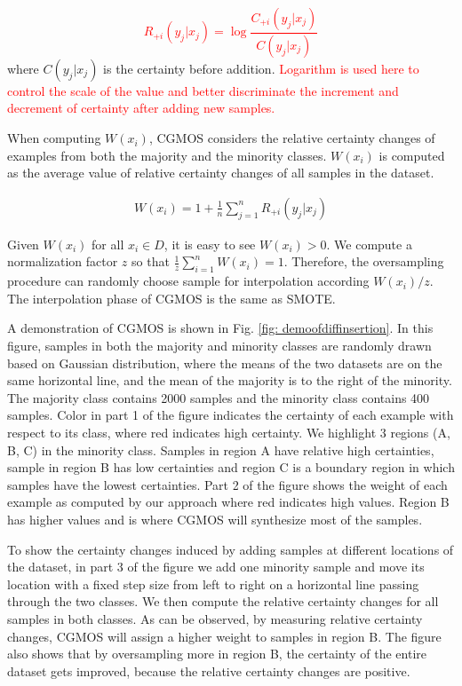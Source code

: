 \documentclass[10pt,journal,compsoc]{IEEEtran}
\begin{document}
\textcolor{red}{
\begin{equation}
R_{+i}(y_j | x_j)= \log\frac{C_{+i}(y_j | x_j)}{C(y_j | x_j)}
\label{eqn: relative diff}
\end{equation}
}
where $C(y_j | x_j)$ is the certainty before addition. \textcolor{red}{Logarithm is used here to control the scale of the value and better discriminate the increment and decrement of certainty after adding new samples.}

When computing $W(x_i)$, CGMOS considers the relative certainty changes of examples from both the majority and the minority classes. $W(x_i)$ is computed as the average value of relative certainty changes of all samples in the dataset.

\begin{equation}
\begin{split}
W(x_i)= 1+\frac{1}{n}\sum_{j=1}^n R_{+i}(y_j | x_j)
\end{split} 
\label{eqn: weight}
\end{equation}

Given $W(x_i)$ for all $x_i \in D$, it is easy to see $W(x_i)>0$. We compute a normalization factor $z$ so that $\frac{1}{z}\sum_{i=1}^n W(x_i)=1$. Therefore, the oversampling procedure can randomly choose sample for interpolation according $W(x_i)/z$. The interpolation phase of CGMOS is  the same as SMOTE\cite{CNV:02}. 

A demonstration of CGMOS is shown in Fig. \ref{fig: demoofdiffinsertion}. In this figure, samples in both the majority and minority classes are randomly drawn based on Gaussian distribution, where the means of the two datasets are on the same horizontal line, and the mean of the majority is to the right of the minority. The majority class contains 2000 samples and the minority class contains 400 samples. Color in part 1 of the figure indicates the certainty of each example with respect to its class, where red indicates high certainty. We highlight 3 regions (A, B, C) in the minority class. Samples in region A have relative high certainties, sample in region B has low certainties and region C is a boundary region in which samples have the lowest certainties. Part 2 of the figure shows the weight of each example as computed by our approach where red indicates high values. Region B has higher values and is where CGMOS will synthesize most of the samples.

To show the certainty changes induced by adding samples at different locations of the dataset, in part 3 of the figure we add one minority sample and move its location with a fixed step size from left to right on a horizontal line passing through the two classes. We then compute the relative certainty changes for all samples in both classes. As can be observed, by measuring relative certainty changes, CGMOS will assign a higher weight to samples in region B. The figure also shows that by oversampling more in region B, the certainty of the entire dataset gets improved, because the relative certainty changes are positive.
\end{document}
